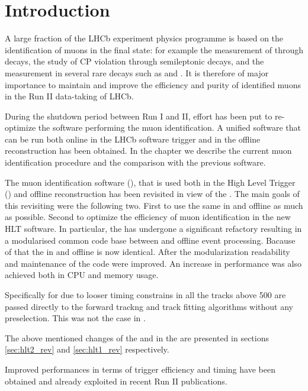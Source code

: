 
\section{Introduction}
\label{sec:Introduction}

A large fraction of the LHCb experiment physics programme is based on the identification of muons in the final state: for example
the measurement of \phis through \BsJpsiPhi decays, the study of CP violation through semileptonic decays, and the measurement
in several rare decays such as \BdKstmumu and \Bsmm.
It is therefore of major importance to maintain and improve the efficiency and purity of identified muons in the Run II data-taking of LHCb.

During the shutdown period between Run I and II, effort has been put to re-optimize the software performing the muon identification.
A unified software that can be run both online in the LHCb software trigger and in the offline reconstruction has been obtained.
In the chapter we describe the current muon identification procedure and the comparison with the previous software.

The muon identification software \cite{LHCb-PUB-2009-013,LHCb-PUB-2010-002} (\muonID),
that is used both in the High Level Trigger (\hlt) \cite{LHCb-PUB-2011-017} and offline reconstruction has been
revisited in view of the \lhc \runtwo.
The main goals of this revisiting were the following two. First to use the same \muonID in \hlt and offline as much as possible.
Second to optimize the efficiency of muon identification in the new HLT software.
In particular, the \muonID has undergone a significant refactory resulting in a modularised common code base
between \hlt and offline event processing.
Bacause of that the \muonID in \hlt and offline is now identical. After the modularization readability and maintenance
of the code were improved.  An increase in performance was also achieved both in CPU and memory usage.

Specifically for \hltone due to looser timing constrains in \runtwo all the tracks above 500 \mevc
are passed directly to the forward trackng and track fitting algorithms without any preselection. This was not the
case in \runone.

The above mentioned changes of the \muonID and in the \hltone are presented in sections \ref{sec:hlt2_rev} and \ref{sec:hlt1_rev} respectively.

Improved performances in terms of trigger efficiency and timing have been obtained and already exploited in recent Run II publications.
